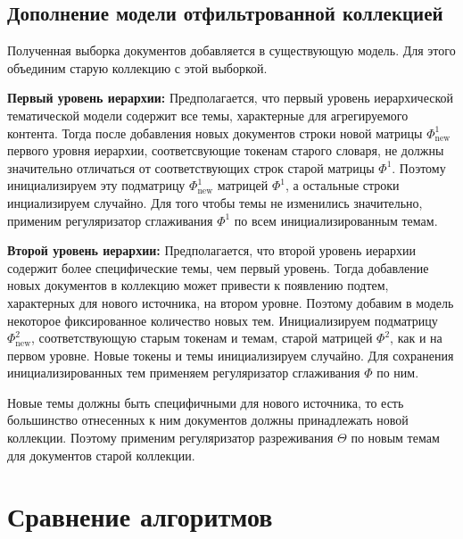 \subsection{Дополнение модели отфильтрованной коллекцией}
Полученная выборка документов добавляется в существующую модель.
Для этого объединим старую коллекцию с этой выборкой.

\textbf{Первый уровень иерархии:}
Предполагается, что первый уровень иерархической тематической модели содержит все темы, характерные для агрегируемого контента. Тогда после добавления новых документов строки новой матрицы $\Phi^{1}_{\text{new}}$ первого уровня иерархии, соответсвующие токенам старого словаря, не должны значительно отличаться от соответствующих строк старой матрицы $\Phi^{1}$. Поэтому инициализируем эту подматрицу $\Phi^{1}_{\text{new}}$ матрицей $\Phi^{1}$, а остальные строки инциализируем случайно. Для того чтобы темы не изменились значительно, применим регуляризатор сглаживания $\Phi^{1}$ по всем инициализированным темам.

\textbf{Второй уровень иерархии:}
Предполагается, что второй уровень иерархии содержит более специфические темы, чем первый уровень. Тогда добавление новых документов в коллекцию может привести к появлению подтем, характерных для нового источника, на втором уровне. Поэтому добавим в модель некоторое фиксированное количество новых тем. Инициализируем подматрицу $\Phi^{2}_{\text{new}}$, соответствующую старым токенам и темам, старой матрицей $\Phi^{2}$, как и на первом уровне. Новые токены и темы инициализируем случайно. Для сохранения инициализированных тем применяем регуляризатор сглаживания $\Phi$ по ним.

Новые темы должны быть специфичными для нового источника, то есть большинство отнесенных к ним документов должны принадлежать новой коллекции. Поэтому применим регуляризатор разреживания $\Theta$ по новым темам для документов старой коллекции.

\section{Сравнение алгоритмов}


